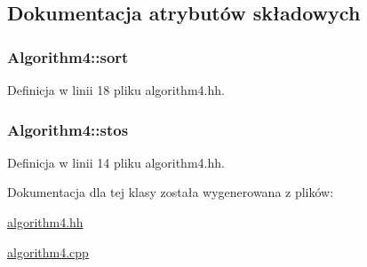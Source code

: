 \subsection{Dokumentacja atrybutów składowych}
\hypertarget{class_algorithm4_afbc43ff18fc5837d95e5746353bfc54a}{
\subsubsection[{sort}]{ Algorithm4\-::sort\hspace{0.3cm}{\ttfamily [private]}}}\label{class_algorithm4_afbc43ff18fc5837d95e5746353bfc54a}


Definicja w linii 18 pliku algorithm4.\-hh.

\hypertarget{class_algorithm4_aa9946110dc906caed6ddc49c60f7a3c8}{
\subsubsection[{stos}]{ Algorithm4\-::stos\hspace{0.3cm}{\ttfamily [private]}}}\label{class_algorithm4_aa9946110dc906caed6ddc49c60f7a3c8}


Definicja w linii 14 pliku algorithm4.\-hh.



Dokumentacja dla tej klasy została wygenerowana z plików\-:\begin{DoxyCompactItemize}
\item 
\hyperlink{algorithm4_8hh}{algorithm4.\-hh}\item 
\hyperlink{algorithm4_8cpp}{algorithm4.\-cpp}\end{DoxyCompactItemize}
